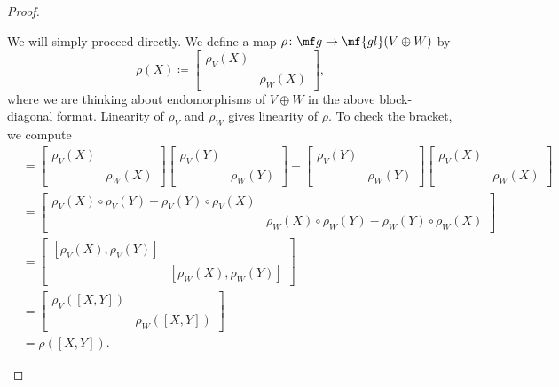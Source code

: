 \documentclass[../notes.tex]{subfiles}
\begin{document}
\begin{proof}
\begin{listalph}
		\item We will simply proceed directly. We define a map $\rho\colon\mf g\to\mf{gl}(V\oplus W)$ by
		\[\rho(X)\coloneqq\begin{bmatrix}
			\rho_V(X) \\ & \rho_W(X)
		\end{bmatrix},\]
		where we are thinking about endomorphisms of $V\oplus W$ in the above block-diagonal format. Linearity of $\rho_V$ and $\rho_W$ gives linearity of $\rho$. To check the bracket, we compute
		\begin{align*}
			[\rho(X),\rho(Y)] &= \begin{bmatrix}
				\rho_V(X) \\ & \rho_W(X)
			\end{bmatrix}\begin{bmatrix}
				\rho_V(Y) \\ & \rho_W(Y)
			\end{bmatrix}-\begin{bmatrix}
				\rho_V(Y) \\ & \rho_W(Y)
			\end{bmatrix}\begin{bmatrix}
				\rho_V(X) \\ & \rho_W(X)
			\end{bmatrix} \\
			&= \begin{bmatrix}
				\rho_V(X)\circ\rho_V(Y)-\rho_V(Y)\circ\rho_V(X) \\
				& \rho_W(X)\circ\rho_W(Y)-\rho_W(Y)\circ\rho_W(X)
			\end{bmatrix} \\
			&= \begin{bmatrix}
				[\rho_V(X),\rho_V(Y)] \\ & [\rho_W(X),\rho_W(Y)]
			\end{bmatrix} \\
			&= \begin{bmatrix}
				\rho_V([X,Y]) \\ & \rho_W([X,Y])
			\end{bmatrix} \\
			&= \rho([X,Y]).
		\end{align*}


\end{listalph}
\end{proof}
\end{document}
